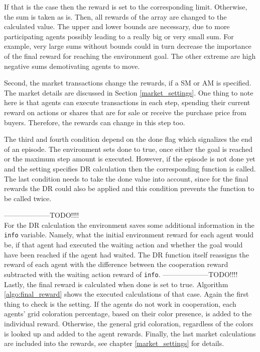 If that is the case then the reward is set to the corresponding limit. Otherwise, the sum is taken as is. Then, all rewards of the array are changed to the calculated value. The upper and lower bounds are necessary, due to more participating agents possibly leading to a really big or very small sum. For example, very large sums without bounds could in turn decrease the importance of the final reward for reaching the environment goal. The other extreme are high negative sums demotivating agents to move.

Second, the market transactions change the rewards, if a SM or AM is specified. The market details are discussed in Section \ref{market_settings}. One thing to note here is that agents can execute transactions in each step, spending their current reward on actions or shares that are for sale or receive the purchase price from buyers. Therefore, the rewards can change in this step too.

The third and fourth condition depend on the done flag which signalizes the end of an episode. The environment sets done to true, once either the goal is reached or the maximum step amount is executed. However, if the episode is not done yet and the setting specifies DR calculation then the corresponding function is called. The last condition needs to take the done value into account, since for the final rewards the DR could also be applied and this condition prevents the function to be called twice. 

--------------------TODO!!!!\\
For the DR calculation the environment saves some additional information in the \verb|info| variable. Namely, what the initial environment reward for each agent would be, if that agent had executed the waiting action and whether the goal would have been reached if the agent had waited. The DR function itself reassigns the reward of each agent with the difference between the cooperation reward subtracted with the waiting action reward of \verb|info|. 
--------------------TODO!!!!\\

Lastly, the final reward is calculated when done is set to true. Algorithm \ref{algo:final_reward} shows the executed calculations of that case. Again the first thing to check is the setting. If the agents do not work in cooperation, each agents' grid coloration percentage, based on their color presence, is added to the individual reward. Otherwise, the general grid coloration, regardless of the colors is looked up and added to the agent rewards. Finally, the last market calculations are included into the rewards, see chapter \ref{market_settings} for details.

